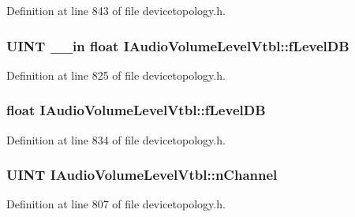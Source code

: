 Definition at line 843 of file devicetopology.\+h.

\subsubsection[{\texorpdfstring{f\+Level\+DB}{fLevelDB}}]{ {\bf U\+I\+NT} {\bf \+\_\+\+\_\+in} float I\+Audio\+Volume\+Level\+Vtbl\+::f\+Level\+DB}\hypertarget{struct_i_audio_volume_level_vtbl_a6b3a564be9b2de387732649f77ec5102}{}\label{struct_i_audio_volume_level_vtbl_a6b3a564be9b2de387732649f77ec5102}


Definition at line 825 of file devicetopology.\+h.

\subsubsection[{\texorpdfstring{f\+Level\+DB}{fLevelDB}}]{ float I\+Audio\+Volume\+Level\+Vtbl\+::f\+Level\+DB}\hypertarget{struct_i_audio_volume_level_vtbl_a0c7f3736276257ae987ed784531296f1}{}\label{struct_i_audio_volume_level_vtbl_a0c7f3736276257ae987ed784531296f1}


Definition at line 834 of file devicetopology.\+h.

\subsubsection[{\texorpdfstring{n\+Channel}{nChannel}}]{ {\bf U\+I\+NT} I\+Audio\+Volume\+Level\+Vtbl\+::n\+Channel}\hypertarget{struct_i_audio_volume_level_vtbl_a4d98c7d02e09eb211e09f13c4c4ebdd6}{}\label{struct_i_audio_volume_level_vtbl_a4d98c7d02e09eb211e09f13c4c4ebdd6}


Definition at line 807 of file devicetopology.\+h.


